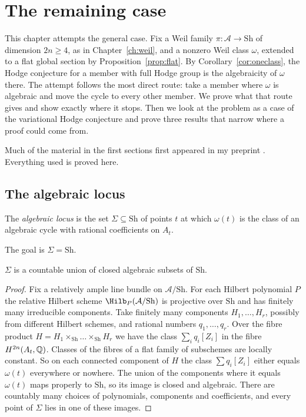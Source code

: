 \chapter{The remaining case}\label{ch:remaining}

This chapter attempts the general case. Fix a Weil family
$\pi\colon\mathcal A\to\mathrm{Sh}$ of dimension $2n\ge4$, as in
Chapter~\ref{ch:weil}, and a nonzero Weil class $\omega$, extended to a flat
global section by Proposition~\ref{prop:flat}. By
Corollary~\ref{cor:oneclass}, the Hodge conjecture for a member with full
Hodge group is the algebraicity of $\omega$ there. The attempt follows the
most direct route: take a member where $\omega$ is algebraic and move the
cycle to every other member. We prove what that route gives and show
exactly where it stops. Then we look at the problem as a case of the
variational Hodge conjecture and prove three results that narrow where a
proof could come from.

Much of the material in the first sections first appeared in my preprint
\cite{BhH8}. Everything used is proved here.

\section{The algebraic locus}

\begin{definition}
The \emph{algebraic locus} is the set $\Sigma\subseteq\mathrm{Sh}$ of points
$t$ at which $\omega(t)$ is the class of an algebraic cycle with rational
coefficients on $A_{t}$.
\end{definition}

The goal is $\Sigma=\mathrm{Sh}$.

\begin{lemma}\label{lem:countablebook}
$\Sigma$ is a countable union of closed algebraic subsets of $\mathrm{Sh}$.
\end{lemma}

\begin{proof}
Fix a relatively ample line bundle on $\mathcal A/\mathrm{Sh}$. For each Hilbert
polynomial $P$ the relative Hilbert scheme $\Hilb_{P}(\mathcal A/\mathrm{Sh})$ is
projective over $\mathrm{Sh}$ and has finitely many irreducible components. Take
finitely many components $H_{1},\dots,H_{r}$, possibly from different
Hilbert schemes, and rational numbers $q_{1},\dots,q_{r}$. Over the fibre
product $H=H_{1}\times_{\mathrm{Sh}}\dots\times_{\mathrm{Sh}}H_{r}$ we have the
class $\sum_{i}q_{i}[Z_{i}]$ in the fibre $H^{2n}(A_{t},\mathbb{Q})$. Classes of
the fibres of a flat family of subschemes are locally constant. So on each
connected component of $H$ the class $\sum q_{i}[Z_{i}]$ either equals
$\omega(t)$ everywhere or nowhere. The union of the components where it
equals $\omega(t)$ maps properly to $\mathrm{Sh}$, so its image is closed and
algebraic. There are countably many choices of polynomials, components
and coefficients, and every point of $\Sigma$ lies in one of these images.
\end{proof}

